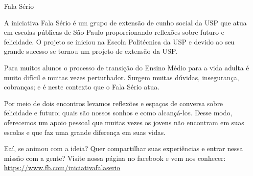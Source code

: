 \begin{subsecao}{Fala Sério}


A iniciativa Fala Sério é um grupo de extensão de cunho social da USP que atua em
escolas públicas de São Paulo proporcionando reflexões sobre futuro e felicidade.
O projeto se iniciou na Escola Politécnica da USP e devido ao seu grande sucesso 
se tornou um projeto de extensão da USP.

Para muitos alunos o processo de transição do Ensino Médio para a vida adulta é 
muito difícil e muitas vezes perturbador. Surgem muitas dúvidas, insegurança, 
cobranças; e é neste contexto que o Fala Sério atua.

Por meio de dois encontros levamos reflexões e espaços de conversa sobre 
felicidade e futuro; quais são nossos sonhos e como alcançá-los. Desse modo, 
oferecemos um apoio pessoal que muitas vezes os jovens não encontram em suas 
escolas e que faz uma grande diferença em suas vidas.

Eaí, se animou com a ideia? Quer compartilhar suas experiências e entrar nessa 
missão com a gente? Visite nossa página no facebook e vem nos conhecer:
\url{https://www.fb.com/iniciativafalaserio}

\end{subsecao}
